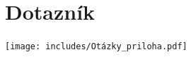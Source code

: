 \documentclass[12pt, oneside]{book}
\begin{document}
\newpage

\begin{minipage}{\textwidth}

\chapter{Dotazník}

\vspace*{-1.24in}
        \centerline{\texttt{[image: includes/Otázky\_priloha.pdf]}}
\vspace{\floatsep}
\end{minipage}
\end{document}
